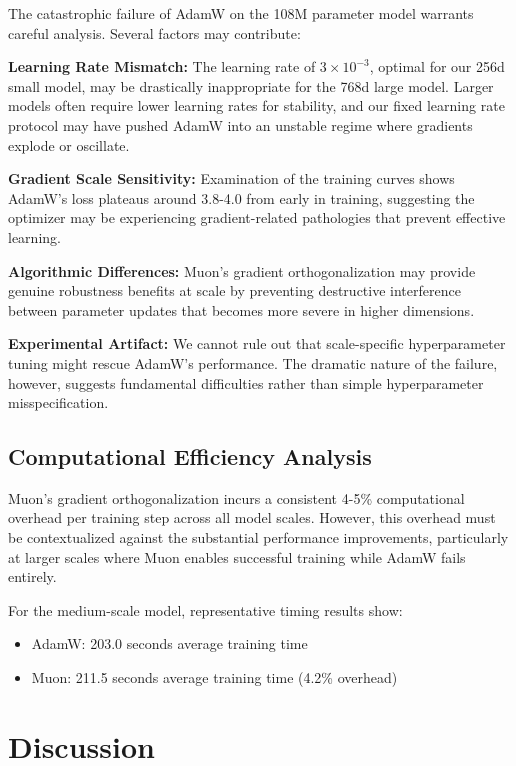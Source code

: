\documentclass[11pt,a4paper]{article}
\begin{document}
The catastrophic failure of AdamW on the 108M parameter model warrants careful analysis. Several factors may contribute:

\textbf{Learning Rate Mismatch:} The learning rate of $3 \times 10^{-3}$, optimal for our 256d small model, may be drastically inappropriate for the 768d large model. Larger models often require lower learning rates for stability, and our fixed learning rate protocol may have pushed AdamW into an unstable regime where gradients explode or oscillate.

\textbf{Gradient Scale Sensitivity:} Examination of the training curves shows AdamW's loss plateaus around 3.8-4.0 from early in training, suggesting the optimizer may be experiencing gradient-related pathologies that prevent effective learning.

\textbf{Algorithmic Differences:} Muon's gradient orthogonalization may provide genuine robustness benefits at scale by preventing destructive interference between parameter updates that becomes more severe in higher dimensions.

\textbf{Experimental Artifact:} We cannot rule out that scale-specific hyperparameter tuning might rescue AdamW's performance. The dramatic nature of the failure, however, suggests fundamental difficulties rather than simple hyperparameter misspecification.

\subsection{Computational Efficiency Analysis}

Muon's gradient orthogonalization incurs a consistent 4-5\% computational overhead per training step across all model scales. However, this overhead must be contextualized against the substantial performance improvements, particularly at larger scales where Muon enables successful training while AdamW fails entirely.

For the medium-scale model, representative timing results show:
\begin{itemize}[leftmargin=*]
    \item AdamW: 203.0 seconds average training time
    \item Muon: 211.5 seconds average training time (4.2\% overhead)
\end{itemize}

\section{Discussion}
\end{document}
